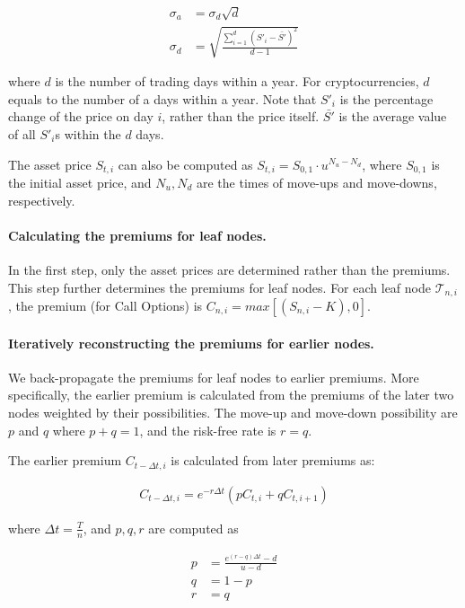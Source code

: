 \begin{align} 
\sigma_a &= \sigma_d \sqrt{d}\\
\sigma_d &= \sqrt{\frac{\sum^{d}_{i=1} (S'_i - \bar{S'})^2}{d-1}}
\end{align}

where $d$ is the number of trading days within a year.
For cryptocurrencies, $d$ equals to the number of a days within a year.
Note that $S'_i$ is the percentage change of the price on day $i$, rather than the price itself.
$\bar{S'}$ is the average value of all $S'_i$s within the $d$ days. 

The asset price $S_{t, i}$ can also be computed as $S_{t, i} = S_{0, 1} \cdot u^{N_u - N_d}$, where $S_{0, 1}$ is the initial asset price, and $N_u, N_d$ are the times of move-ups and move-downs, respectively.

\paragraph{Calculating the premiums for leaf nodes.}
In the first step, only the asset prices are determined rather than the premiums.
This step further determines the premiums for leaf nodes.
For each leaf node $\mathcal{T}_{n, i}$, the premium (for Call Options) is $C_{n, i} = max[(S_{n, i} - K), 0]$.

\paragraph{Iteratively reconstructing the premiums for earlier nodes.}
We back-propagate the premiums for leaf nodes to earlier premiums.
More specifically, the earlier premium is calculated from the premiums of the later two nodes weighted by their possibilities.
The move-up and move-down possibility are $p$ and $q$ where $p + q = 1$, and the risk-free rate is $r = q$.

The earlier premium $C_{t - \Delta t, i}$ is calculated from later premiums as:

\begin{align}
C_{t - \Delta t, i} = e^{-r \Delta t} (p C_{t, i} + q C_{t, i+1})
\end{align}

where $\Delta t = \frac{T}{n}$, and $p, q, r$ are computed as

\begin{align} 
p &= \frac{e^{(r-q)\Delta t} - d}{u - d}\\
q &= 1 - p\\
r &= q
\end{align}

